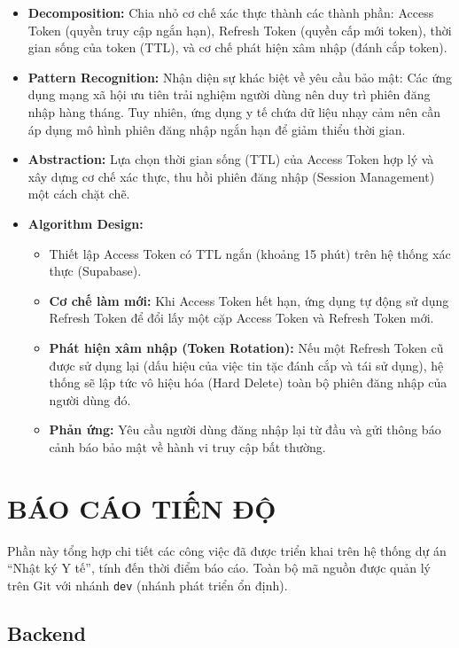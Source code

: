 \documentclass[a4paper,12pt]{article}
\begin{document}
\begin{itemize}
    \item \textbf{Decomposition:} Chia nhỏ cơ chế xác thực thành các thành phần: Access Token (quyền truy cập ngắn hạn), Refresh Token (quyền cấp mới token), thời gian sống của token (TTL), và cơ chế phát hiện xâm nhập (đánh cắp token).
    \item \textbf{Pattern Recognition:} Nhận diện sự khác biệt về yêu cầu bảo mật: Các ứng dụng mạng xã hội ưu tiên trải nghiệm người dùng nên duy trì phiên đăng nhập hàng tháng. Tuy nhiên, ứng dụng y tế chứa dữ liệu nhạy cảm nên cần áp dụng mô hình phiên đăng nhập ngắn hạn để giảm thiểu thời gian.
    \item \textbf{Abstraction:} Lựa chọn thời gian sống (TTL) của Access Token hợp lý và xây dựng cơ chế xác thực, thu hồi phiên đăng nhập (Session Management) một cách chặt chẽ.
    \item \textbf{Algorithm Design:}
    \begin{itemize}
        \item Thiết lập Access Token có TTL ngắn (khoảng 15 phút) trên hệ thống xác thực (Supabase).
        \item \textbf{Cơ chế làm mới:} Khi Access Token hết hạn, ứng dụng tự động sử dụng Refresh Token để đổi lấy một cặp Access Token và Refresh Token mới.
        \item \textbf{Phát hiện xâm nhập (Token Rotation):} Nếu một Refresh Token cũ được sử dụng lại (dấu hiệu của việc tin tặc đánh cắp và tái sử dụng), hệ thống sẽ lập tức vô hiệu hóa (Hard Delete) toàn bộ phiên đăng nhập của người dùng đó.
        \item \textbf{Phản ứng:} Yêu cầu người dùng đăng nhập lại từ đầu và gửi thông báo cảnh báo bảo mật về hành vi truy cập bất thường.
    \end{itemize}
\end{itemize}

\section{BÁO CÁO TIẾN ĐỘ}

Phần này tổng hợp chi tiết các công việc đã được triển khai trên hệ thống dự án ``Nhật ký Y tế'', tính đến thời điểm báo cáo.
Toàn bộ mã nguồn được quản lý trên Git với nhánh \texttt{dev} (nhánh phát triển ổn định).
\subsection{Backend}
\end{document}
